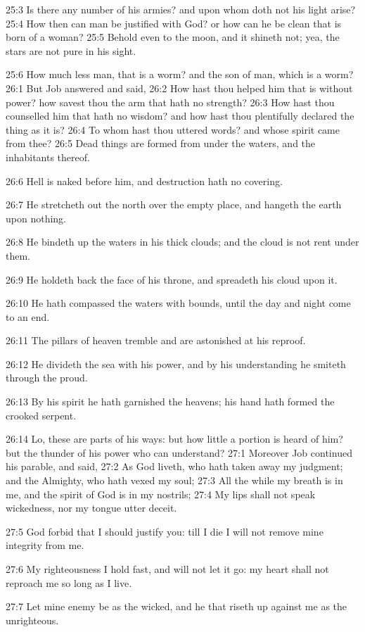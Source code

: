 25:3 Is there any number of his armies? and upon whom doth not his light arise?  25:4 How then can man be justified with God? or how can he be clean that is born of a woman?  25:5 Behold even to the moon, and it shineth not; yea, the stars are not pure in his sight.

25:6 How much less man, that is a worm? and the son of man, which is a worm?  26:1 But Job answered and said, 26:2 How hast thou helped him that is without power? how savest thou the arm that hath no strength?  26:3 How hast thou counselled him that hath no wisdom? and how hast thou plentifully declared the thing as it is?  26:4 To whom hast thou uttered words? and whose spirit came from thee?  26:5 Dead things are formed from under the waters, and the inhabitants thereof.

26:6 Hell is naked before him, and destruction hath no covering.

26:7 He stretcheth out the north over the empty place, and hangeth the earth upon nothing.

26:8 He bindeth up the waters in his thick clouds; and the cloud is not rent under them.

26:9 He holdeth back the face of his throne, and spreadeth his cloud upon it.

26:10 He hath compassed the waters with bounds, until the day and night come to an end.

26:11 The pillars of heaven tremble and are astonished at his reproof.

26:12 He divideth the sea with his power, and by his understanding he smiteth through the proud.

26:13 By his spirit he hath garnished the heavens; his hand hath formed the crooked serpent.

26:14 Lo, these are parts of his ways: but how little a portion is heard of him? but the thunder of his power who can understand?  27:1 Moreover Job continued his parable, and said, 27:2 As God liveth, who hath taken away my judgment; and the Almighty, who hath vexed my soul; 27:3 All the while my breath is in me, and the spirit of God is in my nostrils; 27:4 My lips shall not speak wickedness, nor my tongue utter deceit.

27:5 God forbid that I should justify you: till I die I will not remove mine integrity from me.

27:6 My righteousness I hold fast, and will not let it go: my heart shall not reproach me so long as I live.

27:7 Let mine enemy be as the wicked, and he that riseth up against me as the unrighteous.

